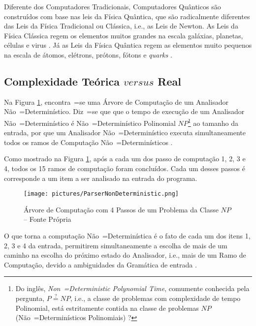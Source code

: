{{    Diferente dos Computadores Tradicionais,
    Computadores Quânticos são construídos com base nas leis da Física Quântica,
    que são radicalmente diferentes das Leis da Física Tradicional ou
    Clássica, i.e.,
    as Leis de Newton.
    As Leis da Física Clássica regem os elementos muitos grandes na escala galáxias,
    planetas, células e
    virus \cite{halliday2013fundamentals}.
    Já as Leis da Física Quântica regem as elementos muito pequenos na escala de átomos,
    elétrons, prótons, fótons e
    \textit{quarks} \cite{dicke1963QuantumPhysicsIntroduction}.
}

\subsection{Complexidade Teórica $versus$ Real}

    Na Figura \ref{fig:pictures/ParserNonDeterministic.png},
    encontra~=se uma Árvore de Computação de um Analisador Não~=Determinístico.
    Diz~=se que que o tempo de execução de um Analisador Não~=Determinístico é Não~=Determinístico  Polinomial $NP$\footnote{
    Do inglês, \textit{Non~=Deterministic Polynomial Time},
    comumente conhecida pela pergunta,
    $P \stackrel{?}{=} NP$, i.e.,
    a classe de problemas com complexidade de tempo Polinomial,
    está estritamente contida na classe de problemas $NP$ (Não~=Determinísticos Polinomiais) \cite{computationalComplexityAuroraBarak}?
    }
    ao tamanho da entrada,
    por que um Analisador Não~=Determinístico executa simultaneamente todos os ramos de Computação Não~=Determinísticos \cite{hopcroftBook}.

    Como mostrado na Figura \ref{fig:pictures/ParserNonDeterministic.png},
    após a cada um dos passo de computação 1,
    2, 3 e 4,
    todos os 15 ramos de computação foram concluídos.
    Cada um desses passos é corresponde a um item a ser analisado na entrada do programa.
    \begin{figure}[h]
    \centering
    \texttt{[image: pictures/ParserNonDeterministic.png]}
    \caption[Árvore de Computação com 4 Passos de um Problema da Classe $NP$]{Árvore de Computação com 4 Passos de um Problema da Classe $NP$ -- Fonte Própria}
    \label{fig:pictures/ParserNonDeterministic.png}
    \end{figure}

    O que torna a computação Não~=Determinística é o fato de cada um dos itens 1,
    2, 3 e 4 da entrada,
    permitirem simultaneamente a escolha de mais de um caminho na escolha do próximo estado do Analisador,
    i.e.,
    mais de um Ramo de Computação,
    devido a ambiguidades da Gramática de entrada \cite{antlrBookTerrentParr}.

}
